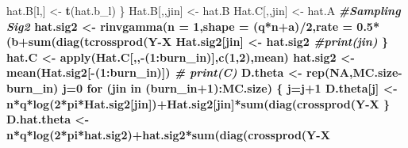 \documentclass[]{book}
\newenvironment{Shaded}{\begin{snugshade}}{\end{snugshade}}
\newcommand{\CommentTok}[1]{\textcolor[rgb]{0.56,0.35,0.01}{\textit{#1}}}
\newcommand{\ControlFlowTok}[1]{\textcolor[rgb]{0.13,0.29,0.53}{\textbf{#1}}}
\newcommand{\DataTypeTok}[1]{\textcolor[rgb]{0.13,0.29,0.53}{#1}}
\newcommand{\DecValTok}[1]{\textcolor[rgb]{0.00,0.00,0.81}{#1}}
\newcommand{\FloatTok}[1]{\textcolor[rgb]{0.00,0.00,0.81}{#1}}
\newcommand{\KeywordTok}[1]{\textcolor[rgb]{0.13,0.29,0.53}{\textbf{#1}}}
\newcommand{\NormalTok}[1]{#1}
\newcommand{\OperatorTok}[1]{\textcolor[rgb]{0.81,0.36,0.00}{\textbf{#1}}}
\newcommand{\OtherTok}[1]{\textcolor[rgb]{0.56,0.35,0.01}{#1}}
\newcommand{\StringTok}[1]{\textcolor[rgb]{0.31,0.60,0.02}{#1}}
\begin{document}
\begin{Shaded}
\begin{Highlighting}[]
{{{{{{\NormalTok{        hat.B[l,] <-}\StringTok{ }\KeywordTok{t}\NormalTok{(hat.b_l)}
\NormalTok{      \}}
\NormalTok{      Hat.B[,,jin] <-}\StringTok{ }\NormalTok{hat.B}
\NormalTok{      Hat.C[,,jin] <-}\StringTok{ }\NormalTok{hat.A}\OperatorTok{%*%}\KeywordTok{t}\NormalTok{(hat.B)}
      \CommentTok{#Sampling Sig2}
\NormalTok{      hat.sig2 <-}\StringTok{ }\KeywordTok{rinvgamma}\NormalTok{(}\DataTypeTok{n =} \DecValTok{1}\NormalTok{,}\DataTypeTok{shape =}\NormalTok{ (q}\OperatorTok{*}\NormalTok{n}\OperatorTok{+}\NormalTok{a)}\OperatorTok{/}\DecValTok{2}\NormalTok{,}\DataTypeTok{rate =} \FloatTok{0.5}\OperatorTok{*}\NormalTok{(b}\OperatorTok{+}\KeywordTok{sum}\NormalTok{(}\KeywordTok{diag}\NormalTok{(}\KeywordTok{tcrossprod}\NormalTok{(Y}\OperatorTok{-}\NormalTok{X}\OperatorTok{%*%}\NormalTok{hat.A}\OperatorTok{%*%}\KeywordTok{t}\NormalTok{(hat.B))))))}
\NormalTok{      Hat.sig2[jin] <-}\StringTok{ }\NormalTok{hat.sig2}
      \CommentTok{#print(jin)}
\NormalTok{    \}}
\NormalTok{    hat.C <-}\StringTok{ }\KeywordTok{apply}\NormalTok{(Hat.C[,,}\OperatorTok{-}\NormalTok{(}\DecValTok{1}\OperatorTok{:}\NormalTok{burn_in)],}\KeywordTok{c}\NormalTok{(}\DecValTok{1}\NormalTok{,}\DecValTok{2}\NormalTok{),mean)}
\NormalTok{    hat.sig2 <-}\StringTok{ }\KeywordTok{mean}\NormalTok{(Hat.sig2[}\OperatorTok{-}\NormalTok{(}\DecValTok{1}\OperatorTok{:}\NormalTok{burn_in)])}
    \CommentTok{# print(C)}
\NormalTok{    D.theta <-}\StringTok{ }\KeywordTok{rep}\NormalTok{(}\OtherTok{NA}\NormalTok{,MC.size}\OperatorTok{-}\NormalTok{burn_in)}
\NormalTok{    j=}\DecValTok{0}
    \ControlFlowTok{for}\NormalTok{ (jin }\ControlFlowTok{in}\NormalTok{ (burn_in}\OperatorTok{+}\DecValTok{1}\NormalTok{)}\OperatorTok{:}\NormalTok{MC.size) \{}
\NormalTok{      j=j}\OperatorTok{+}\DecValTok{1}
\NormalTok{      D.theta[j] <-}\StringTok{ }\NormalTok{n}\OperatorTok{*}\NormalTok{q}\OperatorTok{*}\KeywordTok{log}\NormalTok{(}\DecValTok{2}\OperatorTok{*}\NormalTok{pi}\OperatorTok{*}\NormalTok{Hat.sig2[jin])}\OperatorTok{+}\NormalTok{Hat.sig2[jin]}\OperatorTok{*}\KeywordTok{sum}\NormalTok{(}\KeywordTok{diag}\NormalTok{(}\KeywordTok{crossprod}\NormalTok{(Y}\OperatorTok{-}\NormalTok{X}\OperatorTok{%*%}\NormalTok{Hat.C[,,jin])))}
\NormalTok{    \}}
\NormalTok{    D.hat.theta <-}\StringTok{ }\NormalTok{n}\OperatorTok{*}\NormalTok{q}\OperatorTok{*}\KeywordTok{log}\NormalTok{(}\DecValTok{2}\OperatorTok{*}\NormalTok{pi}\OperatorTok{*}\NormalTok{hat.sig2)}\OperatorTok{+}\NormalTok{hat.sig2}\OperatorTok{*}\KeywordTok{sum}\NormalTok{(}\KeywordTok{diag}\NormalTok{(}\KeywordTok{crossprod}\NormalTok{(Y}\OperatorTok{-}\NormalTok{X}\OperatorTok{%*%}\NormalTok{hat.C)))}
}}}}}}}}}}
\end{Highlighting}
\end{Shaded}
\end{document}
